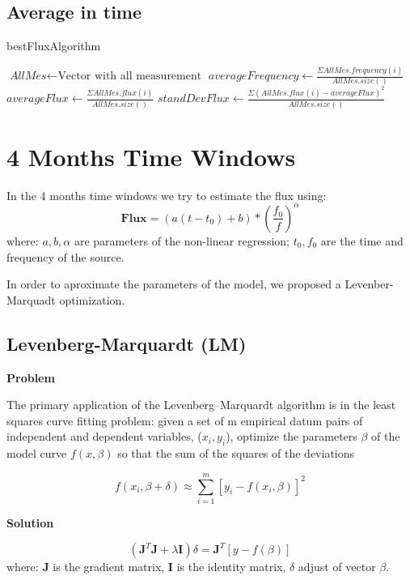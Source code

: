 \documentclass[10pt]{article}
\begin{document}
\subsection{Average in time}
\begin{algorithm}
\caption{bestFluxAlgorithm}\label{4months}
\begin{algorithmic}[1]
\State $\textit{AllMes} \gets \text{Vector with all measurement}$
\Statex
\State $\textit{averageFrequency} \gets \frac{\Sigma AllMes.frequency(i)}{AllMes.size()}$
\Statex
\State $\textit{averageFlux} \gets \frac{\Sigma AllMes.flux(i)}{AllMes.size()}$
\Statex
\State $\textit{standDevFlux} \gets \frac{\Sigma (AllMes.flux(i) - averageFlux)^2}{AllMes.size()}$
\Statex
\State {}
\EndProcedure
\end{algorithmic}
\end{algorithm}

\section{4 Months Time Windows}
In the 4 months time windows we try to estimate the flux using:
$$ \mathbf{Flux} = (a(t-t_0)+b)*\left(\frac{f_0}{f}\right)^\alpha $$
where: $a,b,\alpha$ are parameters of the non-linear regression; $t_0, f_0$ are
the time and frequency of the source.

In order to aproximate the parameters of the model, we proposed a
Levenber-Marquadt optimization. 

\subsection{Levenberg-Marquardt (LM)}
\textbf{Problem} 

The primary application of the Levenberg–Marquardt algorithm is in the least
squares curve fitting problem: given a set of m empirical datum pairs of
independent and dependent variables, ($x_i, y_i$), optimize the parameters
$\beta$ of the model curve $f(x,\beta)$ so that the sum of the squares of the
deviations

$$ f(x_i, \beta + \delta) \approx \sum\limits_{i=1}^m [y_i - f(x_i, \beta)]^2 $$

\noindent\textbf{Solution} 

$$ (\mathbf{J}^{T}\mathbf{J} + \lambda\mathbf{I})\delta = \mathbf{J}^{T}[y - f(\beta)] $$
where: $\mathbf{J}$ is the gradient matrix, $\mathbf{I}$ is the identity matrix, $\delta$ adjust of vector $\beta$.
\end{document}
